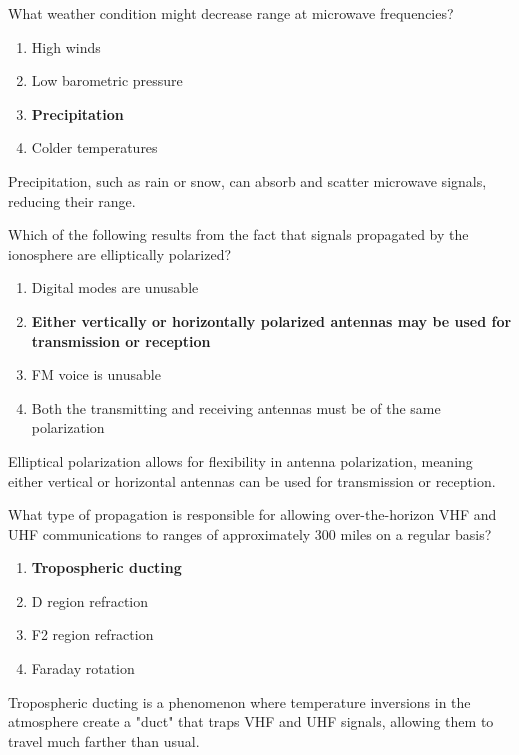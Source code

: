 \begin{tcolorbox}[colback=gray!10!white,colframe=black!75!black,title={T3A07}]
    What weather condition might decrease range at microwave frequencies?
    \begin{enumerate}[label=\Alph*),noitemsep]
        \item High winds
        \item Low barometric pressure
        \item \textbf{Precipitation}
        \item Colder temperatures
    \end{enumerate}
\end{tcolorbox}
Precipitation, such as rain or snow, can absorb and scatter microwave signals, reducing their range.

\begin{tcolorbox}[colback=gray!10!white,colframe=black!75!black,title={T3A09}]
    Which of the following results from the fact that signals propagated by the ionosphere are elliptically polarized?
    \begin{enumerate}[label=\Alph*),noitemsep]
        \item Digital modes are unusable
        \item \textbf{Either vertically or horizontally polarized antennas may be used for transmission or reception}
        \item FM voice is unusable
        \item Both the transmitting and receiving antennas must be of the same polarization
    \end{enumerate}
\end{tcolorbox}
Elliptical polarization allows for flexibility in antenna polarization, meaning either vertical or horizontal antennas can be used for transmission or reception.

\begin{tcolorbox}[colback=gray!10!white,colframe=black!75!black,title={T3C06}]
    What type of propagation is responsible for allowing over-the-horizon VHF and UHF communications to ranges of approximately 300 miles on a regular basis?
    \begin{enumerate}[label=\Alph*),noitemsep]
        \item \textbf{Tropospheric ducting}
        \item D region refraction
        \item F2 region refraction
        \item Faraday rotation
    \end{enumerate}
\end{tcolorbox}
Tropospheric ducting is a phenomenon where temperature inversions in the atmosphere create a "duct" that traps VHF and UHF signals, allowing them to travel much farther than usual.

